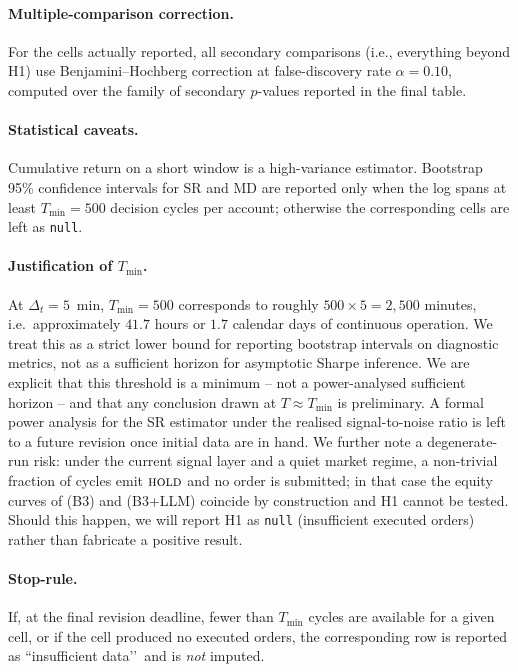 \documentclass{article}
\begin{document}
\paragraph{Multiple-comparison correction.} For the cells actually reported, all secondary comparisons (i.e., everything beyond H1) use Benjamini--Hochberg correction at false-discovery rate $\alpha = 0.10$, computed over the family of secondary $p$-values reported in the final table.

\paragraph{Statistical caveats.} Cumulative return on a short window is a high-variance estimator. Bootstrap 95\% confidence intervals for SR and MD are reported only when the log spans at least $T_{\min} = 500$ decision cycles per account; otherwise the corresponding cells are left as \texttt{null}.

\paragraph{Justification of $T_{\min}$.} At $\Delta_t = 5$~min, $T_{\min} = 500$ corresponds to roughly $500 \times 5 = 2{,}500$ minutes, i.e.\ approximately $41.7$ hours or $1.7$ calendar days of continuous operation. We treat this as a strict lower bound for reporting bootstrap intervals on diagnostic metrics, not as a sufficient horizon for asymptotic Sharpe inference. We are explicit that this threshold is a minimum -- not a power-analysed sufficient horizon -- and that any conclusion drawn at $T \approx T_{\min}$ is preliminary. A formal power analysis for the SR estimator under the realised signal-to-noise ratio is left to a future revision once initial data are in hand. We further note a degenerate-run risk: under the current signal layer and a quiet market regime, a non-trivial fraction of cycles emit $\textsc{hold}$ and no order is submitted; in that case the equity curves of (B3) and (B3+LLM) coincide by construction and H1 cannot be tested. Should this happen, we will report H1 as \texttt{null} (insufficient executed orders) rather than fabricate a positive result.

\paragraph{Stop-rule.} If, at the final revision deadline, fewer than $T_{\min}$ cycles are available for a given cell, or if the cell produced no executed orders, the corresponding row is reported as ``insufficient data\textquoteright\textquoteright\ and is \emph{not} imputed.
\end{document}
